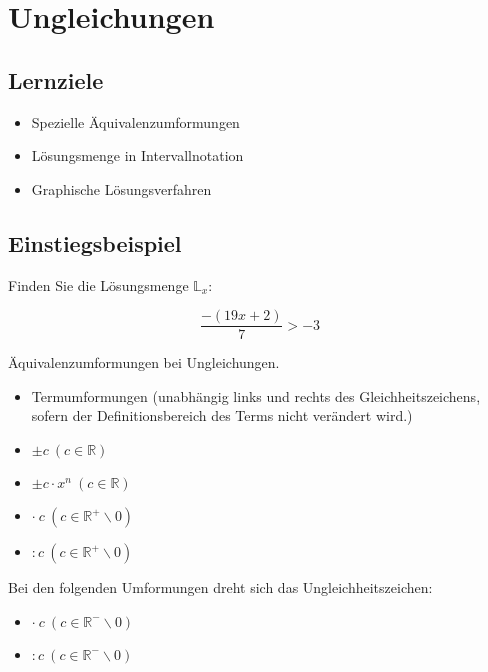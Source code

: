 
\section{Ungleichungen}


\subsection*{Lernziele}

\begin{itemize}
\item Spezielle Äquivalenzumformungen
\item Lösungsmenge in Intervallnotation
\item Graphische Lösungsverfahren
\end{itemize}


\subsection{Einstiegsbeispiel}
Finden Sie die Lösungsmenge $\mathbb{L}_x$:

$$\frac{-(19x+2)}{7} > -3$$


\TNT{8}{
  $\cdot{}7$
  $$-(19x+2) > -21$$
  $\cdot{}(-1)$
  $$19x+2 < 21$$
  $-2$
  $$19x<19$$
  $:19$
  $$x<1$$
  Lösungsmenge
  $$\mathbb{L}_x = ]\infty;1]$$
}%


  \newpage
  
\begin{gesetz}{}{}
  Äquivalenzumformungen bei Ungleichungen.

  \begin{itemize}
	\item Termumformungen (unabhängig links und rechts des Gleichheitszeichens, sofern der Definitionsbereich des Terms nicht verändert wird.)
	\item $\pm    c\ (c \in \mathbb{R})$
	\item $\pm    c\cdot{}x^n\ (c \in \mathbb{R})$
	\item $\cdot\ c\ (c \in \mathbb{R}^+\backslash 0)$
	\item $:      c\ (c \in \mathbb{R}^+\backslash 0)$
\end{itemize}

Bei den folgenden Umformungen dreht sich das Ungleichheitszeichen:
\begin{itemize}
	\item $\cdot\ c\ (c \in \mathbb{R}^-\backslash 0)$
	\item $:      c\ (c \in \mathbb{R}^-\backslash 0)$
  \end{itemize}
  
  \end{gesetz}

